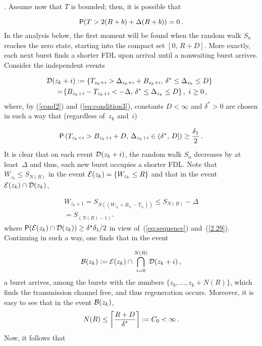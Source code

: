 \begin{multicols}{2}
. Assume now that $T$ is bounded; then, it is possible that

\noindent
$$
{\sf P}(T>2(R+b)+\Delta(R+b))=0\,.
$$
In the analysis below,
the first  moment will be found when the random walk
 $S_n$ reaches the zero state, starting into the compact set $[0,\,R+D]$.
More exactly,  each next  burst finds a  shorter FDL upon arrival
until a nonwaiting burst arrives. Consider the independent events

\noindent
\begin{multline*}
\!\!\!{\cal D}(z_{k}+i):= \{T_{z_{k}+i}>\Delta_{z_k+i}+B_{z_{k}+i},\,
\delta^* \le \Delta_{z_k} \le D\} \hspace*{-0.13023pt}\\ 
{} = \!\{B_{z_{k}+i}-T_{z_{k}+i} < -\Delta , \, 
\delta^* \le \Delta_{z_k} \le D \}\,, \ i\ge0\,, %
\end{multline*}
where,  by (\ref{cond2}) and  (\ref{eq:condition3}), constants 
$D<\infty$ and $\delta^*>0$ are  chosen in  such a way that (regardless of~$z_k$ and~$i$)

\noindent
\begin{equation}
{\sf P}\left(T_{z_k+i} > B_{z_k+i} + D,\, \Delta_{z_k+i}\in (\delta^*, \, D]\right)\ge 
\displaystyle\frac{\displaystyle \delta_1\mathstrut}{\displaystyle 2\mathstrut}\,.
\label{2.29}
\end{equation}
It is clear that on each event ${\cal D}(z_{k}+i)$, the random
walk $S_n$ decreases by at least~$\Delta$ and thus, each new
burst occupies a shorter FDL. Note that $W_{z_k}\le S_{N(R)}$ in 
the event ${\cal E}(z_{k})=\{W_{z_{k}}\le R\}$ and that in
the event ${\cal E}(z_{k})\cap{\cal D}(z_{k})$,

\noindent
\begin{multline*}
W_{z_{k}+1}  =  S_{N ((W_{z_k}+B_{z_k}-T_{z_k}))}  \le
S_{N(R)}-\Delta \\
=S_{(N(R)-1)^+}
\end{multline*}
where   ${\sf P}({\cal E}(z_{k})\cap{\cal D}(z_{k}))\ge
\delta^\star\delta_{1}/2$ in view of~(\ref{eq:sequence}) and~(\ref{2.29}). 
Continuing in such a way, one finds that in the event

\noindent
$$
{\cal B} (z_k):={\cal E}(z_{k})\cap\bigcap_{i=0}^{N(R)}{\cal D}(z_{k}+i)\,,
$$
a  burst arrives, among the bursts with the numbers $\{z_k,\ldots,
z_k+N(R)\}$,  which finds the transmission channel free, and thus 
regeneration occurs.  Moreover, it is easy to see that in the event
${\cal B}(z_k)$, 
\begin{equation*}
N(R)\le \left\lceil \displaystyle\frac{\displaystyle R+D\mathstrut}{\displaystyle \delta^{*}\mathstrut}\right\rceil:=C_0 <\infty\,.
\end{equation*}
Now, it follows that


\end{multicols}
